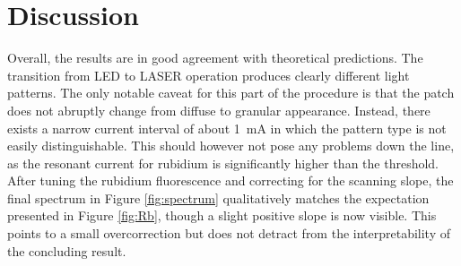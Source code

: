 \section{Discussion}
\label{sec:discussion}

Overall, the results are in good agreement with theoretical predictions. The transition from LED to LASER operation
produces clearly different light patterns. The only notable caveat for this part of the procedure is that the patch does not
abruptly change from diffuse to granular appearance. Instead, there exists a narrow current interval of about
\qty{1}{\milli\ampere} in which the pattern type is not easily distinguishable. This should however not pose any problems
down the line, as the resonant current for rubidium is significantly higher than the threshold. After tuning the rubidium
fluorescence and correcting for the scanning slope, the final spectrum in Figure \ref{fig:spectrum} qualitatively matches
the expectation presented in Figure \ref{fig:Rb}, though a slight positive slope is now visible. This points to a small
overcorrection but does not detract from the interpretability of the concluding result.
